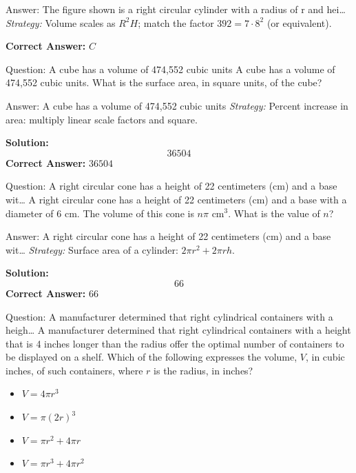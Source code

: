 \documentclass{beamer}
\begin{document}
\begin{frame}{Answer: The figure shown is a right circular cylinder with a radius of r and hei…}
\textit{Strategy:} Volume scales as $R^2 H$; match the factor $392 = 7\cdot 8^2$ (or equivalent).

\textbf{Correct Answer:} \( \boxed{C} \)

\end{frame}
\begin{frame}{Question: A cube has a volume of 474,552 cubic units}
A cube has a volume of 474{,}552 cubic units.  
What is the surface area, in square units, of the cube?
\end{frame}
\begin{frame}{Answer: A cube has a volume of 474,552 cubic units}
\textit{Strategy:} Percent increase in area: multiply linear scale factors and square.

\textbf{Solution:}
\[ \boxed{36504} \]
\textbf{Correct Answer:} \( \boxed{36504} \)

\end{frame}
\begin{frame}{Question: A right circular cone has a height of 22 centimeters (cm) and a base wit…}
A right circular cone has a height of 22 centimeters (cm) and a base with a diameter of 6 cm.  
The volume of this cone is $n\pi$ cm$^3$. What is the value of $n$?
\end{frame}
\begin{frame}{Answer: A right circular cone has a height of 22 centimeters (cm) and a base wit…}
\textit{Strategy:} Surface area of a cylinder: $2\pi r^2 + 2\pi rh$.

\textbf{Solution:}
\[ \boxed{66} \]
\textbf{Correct Answer:} \( \boxed{66} \)

\end{frame}
\begin{frame}{Question: A manufacturer determined that right cylindrical containers with a heigh…}
A manufacturer determined that right cylindrical containers with a height that is 4 inches longer than the radius  
offer the optimal number of containers to be displayed on a shelf.  
Which of the following expresses the volume, $V$, in cubic inches, of such containers, where $r$ is the radius, in inches?
\begin{itemize}
    \item[\textbf{A.}] $V = 4\pi r^3$
    \item[\textbf{B.}] $V = \pi (2r)^3$
    \item[\textbf{C.}] $V = \pi r^2 + 4\pi r$
    \item[\textbf{D.}] $V = \pi r^3 + 4\pi r^2$
\end{itemize}
\end{frame}
\end{document}
